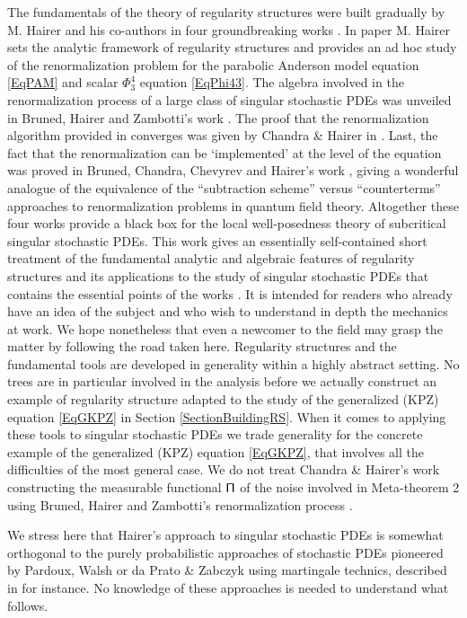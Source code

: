 \documentclass[10pt, reqno]{amsart}
\numberwithin{subsection}{section}
\numberwithin{subsubsection}{subsection}
\numberwithin{equation}{section} %
\theoremstyle{mystyle}
\theoremstyle{mystyle2}
\theoremstyle{mystyle3}
\begin{document}
The fundamentals of the theory of regularity structures were built gradually by M. Hairer and his co-authors in four groundbreaking works \cite{Hai14, BHZ, ChandraHairer, BCCH18}. In paper \cite{Hai14} M. Hairer sets the analytic framework of regularity structures and provides an ad hoc study of the renormalization problem for the parabolic Anderson model equation \eqref{EqPAM} and scalar $\Phi^4_3$ equation \eqref{EqPhi43}. The algebra involved in the renormalization process of a large class of singular stochastic PDEs was unveiled in Bruned, Hairer and Zambotti's work \cite{BHZ}. The proof that the renormalization algorithm provided in \cite{BHZ} converges was given by Chandra \& Hairer in \cite{ChandraHairer}. Last, the fact that the renormalization can be `implemented' at the level of the equation was proved in Bruned, Chandra, Chevyrev and Hairer's work \cite{BCCH18}, giving a wonderful analogue of the equivalence of the ``subtraction scheme'' versus ``counterterms'' approaches to renormalization problems in quantum field theory. Altogether these four works provide a black box for the local well-posedness theory of subcritical singular stochastic PDEs. This work gives an essentially self-contained short treatment of the fundamental analytic and algebraic features of regularity structures and its applications to the study of singular stochastic PDEs that contains the essential points of the works \cite{Hai14, BHZ, BCCH18}. It is intended for readers who already have an idea of the subject and who wish to understand in depth the mechanics at work. We hope nonetheless that even a newcomer to the field may grasp the matter by following the road taken here. Regularity structures and the fundamental tools are developed in generality within a highly abstract setting. No trees are in particular involved in the analysis before we actually construct an example of regularity structure adapted to the study of the generalized (KPZ) equation \eqref{EqGKPZ} in Section \ref{SectionBuildingRS}. When it comes to applying these tools to singular stochastic PDEs we trade generality for the concrete example of the generalized (KPZ) equation \eqref{EqGKPZ}, that involves all the difficulties of the most general case. We do not treat Chandra \& Hairer's work \cite{ChandraHairer} constructing the measurable functional $\sf \Pi$ of the noise involved in Meta-theorem 2 using Bruned, Hairer and Zambotti's renormalization process \cite{BHZ}.

\medskip

We stress here that Hairer's approach to singular stochastic PDEs is somewhat orthogonal to the purely probabilistic approaches of stochastic PDEs pioneered by Pardoux, Walsh or da Prato \& Zabczyk using martingale technics, described in \cite{DPZ} for instance. No knowledge of these approaches is needed to understand what follows.
\end{document}
